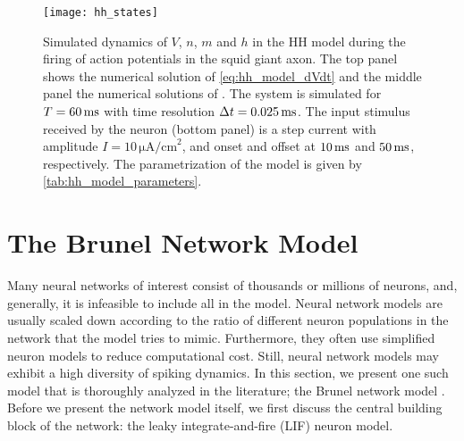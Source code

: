 \begin{figure}[H]
    \centering
    \texttt{[image: hh\_states]}
    \caption{Simulated dynamics of $V$, $n$, $m$ and $h$ in the HH model during the firing of action potentials in the squid giant axon. The top panel shows the numerical solution of \autoref{eq:hh_model_dVdt} and the middle panel the numerical solutions of . The system is simulated for $T = 60 \,\mathrm{ms}$ with time resolution $\Delta t=0.025 \,\mathrm{ms}$. The input stimulus received by the neuron (bottom panel) is a step current with amplitude $I = 10 \, \mathrm{\mu A/cm}^2$, and onset and offset at $10 \,\mathrm{ms}$ and $50 \,\mathrm{ms}$, respectively. The parametrization of the model is given by \autoref{tab:hh_model_parameters}. 
    }
    \label{fig:hh_states}
\end{figure}








\section{The Brunel Network Model}\label{sec:brunel_model}

Many neural networks of interest consist of thousands or millions of neurons, and, generally, it is infeasible to include all in the model. Neural network models are usually scaled down according to the ratio of different neuron populations in the network that the model tries to mimic. Furthermore, they often use simplified neuron models to reduce computational cost. Still, neural network models may exhibit a high diversity of spiking dynamics. In this section, we present one such model that is thoroughly analyzed in the literature; the Brunel network model \cite{Brunel2000}. Before we present the network model itself, we first discuss the central building block of the network: the leaky integrate-and-fire (LIF) neuron model. 


